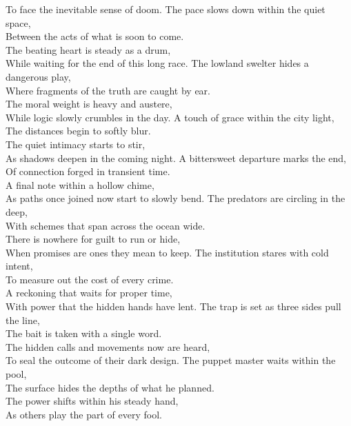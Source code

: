 \begin{lyrics}
To face the inevitable sense of doom.
The pace slows down within the quiet space,\\
Between the acts of what is soon to come.\\
The beating heart is steady as a drum,\\
While waiting for the end of this long race.
The lowland swelter hides a dangerous play,\\
Where fragments of the truth are caught by ear.\\
The moral weight is heavy and austere,\\
While logic slowly crumbles in the day.
A touch of grace within the city light,\\
The distances begin to softly blur.\\
The quiet intimacy starts to stir,\\
As shadows deepen in the coming night.
A bittersweet departure marks the end,\\
Of connection forged in transient time.\\
A final note within a hollow chime,\\
As paths once joined now start to slowly bend.
The predators are circling in the deep,\\
With schemes that span across the ocean wide.\\
There is nowhere for guilt to run or hide,\\
When promises are ones they mean to keep.
The institution stares with cold intent,\\
To measure out the cost of every crime.\\
A reckoning that waits for proper time,\\
With power that the hidden hands have lent.
The trap is set as three sides pull the line,\\
The bait is taken with a single word.\\
The hidden calls and movements now are heard,\\
To seal the outcome of their dark design.
The puppet master waits within the pool,\\
The surface hides the depths of what he planned.\\
The power shifts within his steady hand,\\
As others play the part of every fool.

\end{lyrics}

